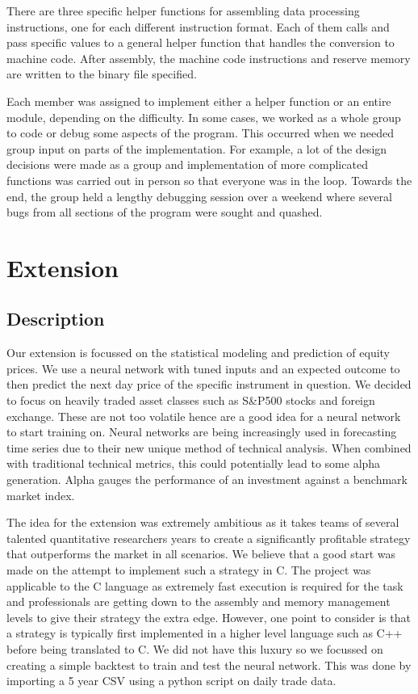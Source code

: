 \documentclass[11pt]{article}
\begin{document}
There are three specific helper functions for assembling data processing instructions,
one for each different instruction format.
Each of them calls and pass specific values to a general helper function that handles
the conversion to machine code.
After assembly, the machine code instructions and reserve memory are written to the binary file specified.

Each member was assigned to implement either a helper function or an entire module, depending on the difficulty.
In some cases, we worked as a whole group to code or debug some aspects of the program.
This occurred when we needed group input on parts of the implementation. For example, a lot of the design decisions were made as a group and implementation of more complicated functions was carried out in person so that everyone was in the loop. Towards the end, the group held a lengthy debugging session over a weekend where several bugs from all sections of the program were sought and quashed.

\section{Extension}
\subsection{Description}
Our extension is focussed on the statistical modeling and prediction of equity prices. We use a neural network with tuned inputs and an expected outcome to then predict the next day price of the specific instrument in question. We decided to focus on heavily traded asset classes such as S\&P500 stocks and foreign exchange. These are not too volatile hence are a good idea for a neural network to start training on. Neural networks are being increasingly used in forecasting time series due to their new unique method of technical analysis. When combined with traditional technical metrics, this could potentially lead to some alpha generation. Alpha gauges the performance of an investment against a benchmark market index.

The idea for the extension was extremely ambitious as it takes teams of several talented quantitative researchers years to create a significantly profitable strategy that outperforms the market in all scenarios. We believe that a good start was made on the attempt to implement such a strategy in C. The project was applicable to the C language as extremely fast execution is required for the task and professionals are getting down to the assembly and memory management levels to give their strategy the extra edge. However, one point to consider is that a strategy is typically first implemented in a higher level language such as C++ before being translated to C. We did not have this luxury so we focussed on creating a simple backtest to train and test the neural network. This was done by importing a 5 year CSV using a python script on daily trade data.
\end{document}
